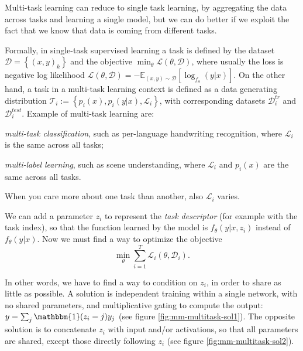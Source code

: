 Multi-task learning can reduce to single task learning, by aggregating the data across tasks and learning a single model, but we can do better if we exploit the fact that we know that data is coming from different tasks.

Formally, in single-task supervised learning a task is defined by the dataset $\mathcal{D} = \left\{(x,y)_k\right\}$ and the objective $\min_\theta \mathcal{L}(\theta, \mathcal{D})$, where usually the loss is negative log likelihood $\mathcal{L}(\theta, \mathcal{D}) = - \mathbb{E}_{(x,y)\sim\mathcal{D}} \left[\log_{f_\theta}(y|x)\right]$. On the other hand, a task in a multi-task learning context is defined as a data generating distribution $\mathcal{T}_i := \left\{ p_i(x), p_i (y|x), \mathcal{L}_i \right\}$, with corresponding datasets $\mathcal{D}_i^{tr}$ and $\mathcal{D}_i^{test}$. Example of multi-task learning are:
\begin{myitem}
    \item \textit{multi-task classification}, such as per-language handwriting recognition, where $\mathcal{L}_i$ is the same across all tasks;
    \item \textit{multi-label learning}, such as scene understanding, where $\mathcal{L}_i$ and $p_i(x)$ are the same across all tasks.
\end{myitem}
When you care more about one task than another, also $\mathcal{L}_i$ varies.

We can add a parameter $z_i$ to represent the \textit{task descriptor} (for example with the task index), so that the function learned by the model is $f_\theta(y|x,z_i)$ instead of $f_\theta(y|x)$. Now we must find a way to optimize the objective
\begin{equation}\label{eq:multi-task-objective}
    \min_\theta \sum_{i=1}^{T} \mathcal{L}_i (\theta, \mathcal{D}_i).
\end{equation}

In other words, we have to find a way to condition on $z_i$, in order to share as little as possible. A solution is independent training within a single network, with no shared parameters, and multiplicative gating to compute the output: $y = \sum_j \mathbbm{1}(z_i = j) y_j$ (see figure \ref{fig:mm-multitask-sol1}). The opposite solution is to concatenate $z_i$ with input and/or activations, so that all parameters are shared, except those directly following $z_i$ (see figure \ref{fig:mm-multitask-sol2}).

